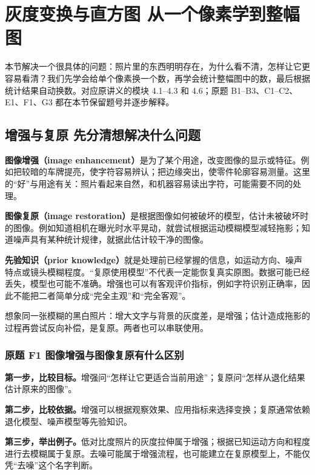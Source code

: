\section{灰度变换与直方图 从一个像素学到整幅图}

本节解决一个很具体的问题：照片里的东西明明存在，为什么看不清，怎样让它更容易看清？我们先学会给单个像素换一个数，再学会统计整幅图中的数，最后根据统计结果自动换数。对应原讲义的模块 4.1--4.3 和 4.6；原题 B1--B3、C1--C2、E1、F1、G3 都在本节保留题号并逐步解释。

\subsection{增强与复原 先分清想解决什么问题}

\textbf{图像增强（image enhancement）}是为了某个用途，改变图像的显示或特征。例如把较暗的车牌提亮，使字符容易辨认；把边缘突出，使零件轮廓容易测量。这里的“好”与用途有关：照片看起来自然，和机器容易读出字符，可能需要不同的处理。

\textbf{图像复原（image restoration）}是根据图像如何被破坏的模型，估计未被破坏时的图像。例如知道相机在曝光时水平晃动，就尝试根据运动模糊模型减轻拖影；知道噪声具有某种统计规律，就据此估计较干净的图像。

\textbf{先验知识（prior knowledge）}就是处理前已经掌握的信息，如运动方向、噪声特点或镜头模糊程度。“复原使用模型”不代表一定能恢复真实原图。数据可能已经丢失，模型也可能不准确。增强也可以有客观评价指标，例如字符识别正确率，因此不能把二者简单分成“完全主观”和“完全客观”。

想象同一张模糊的黑白照片：增大文字与背景的灰度差，是增强；估计造成拖影的过程再尝试反向补偿，是复原。两者也可以串联使用。

\subsubsection*{原题 F1 图像增强与图像复原有什么区别}
\label{original:F1}

\textbf{第一步，比较目标。}增强问“怎样让它更适合当前用途”；复原问“怎样从退化结果估计原来的图像”。

\textbf{第二步，比较依据。}增强可以根据观察效果、应用指标来选择变换；复原通常依赖退化模型、噪声模型等先验知识。

\textbf{第三步，举出例子。}低对比度照片的灰度拉伸属于增强；根据已知运动方向和程度进行去模糊属于复原。去噪可能属于增强流程，也可能建立在复原模型上，不能仅凭“去噪”这个名字判断。

